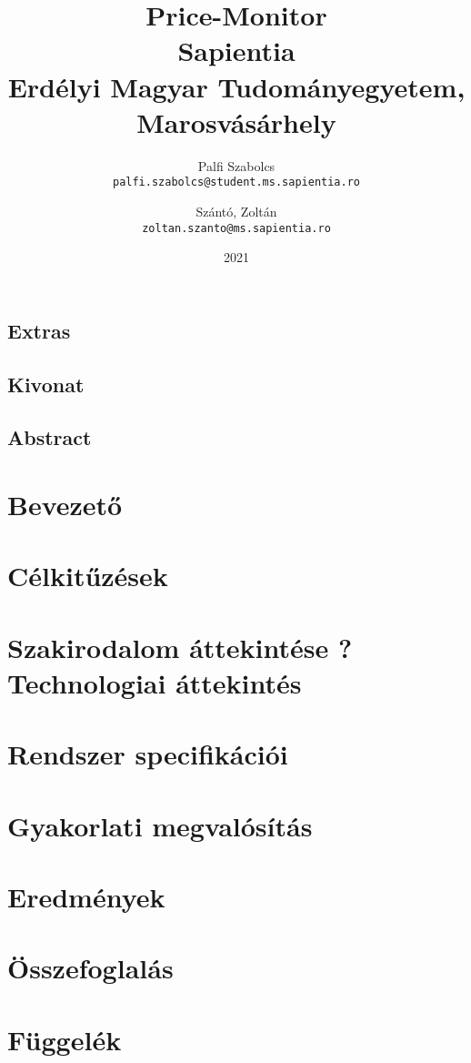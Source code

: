 \documentclass[12pt, twosides]{report}
\title{
	{Price-Monitor}\\
	{\large Sapientia\\
	Erdélyi Magyar Tudományegyetem, Marosvásárhely}
}
\author{
	Palfi Szabolcs\\
	\texttt{palfi.szabolcs@student.ms.sapientia.ro}
	\and
	Szántó, Zoltán\\
	\texttt{zoltan.szanto@ms.sapientia.ro}	
}
\date{2021}
\begin{document}


\section*{Extras}

\pagebreak



\section*{Kivonat}

\pagebreak

\section*{Abstract}

\pagebreak


\tableofcontents

\listoffigures

\chapter{Bevezető}


\chapter{Célkitűzések}


\chapter{Szakirodalom áttekintése ? Technologiai áttekintés}


% 

\chapter{Rendszer specifikációi}


\chapter{Gyakorlati megvalósítás} \label{chpt:implementation}


\chapter{Eredmények}


\chapter{Összefoglalás}





\appendix
\chapter{Függelék}

\end{document}
